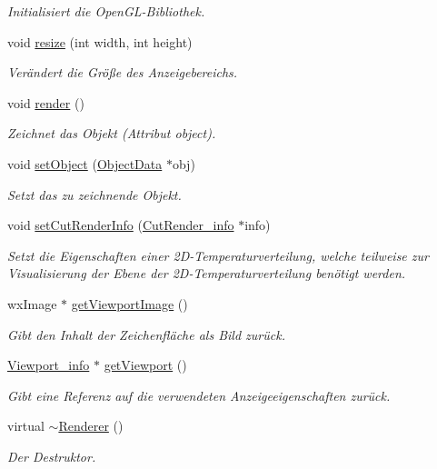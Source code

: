 \begin{DoxyCompactItemize}
\begin{DoxyCompactList}\small\item\em Initialisiert die Open\-G\-L-\/\-Bibliothek. \end{DoxyCompactList}\item 
void \hyperlink{classRenderer_a9f4493c538688adaad4e4f0575fd3b8d}{resize} (int width, int height)
\begin{DoxyCompactList}\small\item\em Verändert die Größe des Anzeigebereichs. \end{DoxyCompactList}\item 
void \hyperlink{classRenderer_af7e5f8f68742f198e315fb4683a605a4}{render} ()
\begin{DoxyCompactList}\small\item\em Zeichnet das Objekt (Attribut object). \end{DoxyCompactList}\item 
void \hyperlink{classRenderer_a9db67fbbd309875b564ca1df08daf372}{set\-Object} (\hyperlink{classObjectData}{Object\-Data} $\ast$obj)
\begin{DoxyCompactList}\small\item\em Setzt das zu zeichnende Objekt. \end{DoxyCompactList}\item 
void \hyperlink{classRenderer_a566b30ae615b9cd74d481f360e0a567e}{set\-Cut\-Render\-Info} (\hyperlink{structUtils_1_1CutRender__info}{Cut\-Render\-\_\-info} $\ast$info)
\begin{DoxyCompactList}\small\item\em Setzt die Eigenschaften einer 2\-D-\/\-Temperaturverteilung, welche teilweise zur Visualisierung der Ebene der 2\-D-\/\-Temperaturverteilung benötigt werden. \end{DoxyCompactList}\item 
wx\-Image $\ast$ \hyperlink{classRenderer_afe4e5a9e26320e0b8276b2d0f82a1827}{get\-Viewport\-Image} ()
\begin{DoxyCompactList}\small\item\em Gibt den Inhalt der Zeichenfläche als Bild zurück. \end{DoxyCompactList}\item 
\hyperlink{structRenderer_1_1Viewport__info}{Viewport\-\_\-info} $\ast$ \hyperlink{classRenderer_a5bfa9daf1a53660f1cf6c254665253e2}{get\-Viewport} ()
\begin{DoxyCompactList}\small\item\em Gibt eine Referenz auf die verwendeten Anzeigeeigenschaften zurück. \end{DoxyCompactList}\item 
virtual \hyperlink{classRenderer_aba42b60392775e4a492c4d14d4fff29f}{$\sim$\-Renderer} ()
\begin{DoxyCompactList}\small\item\em Der Destruktor. \end{DoxyCompactList}\end{DoxyCompactItemize}
